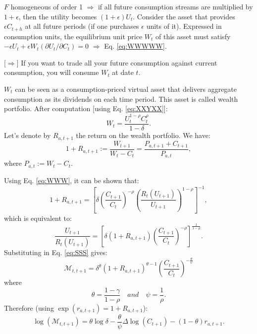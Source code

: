 \documentclass[
  12pt,
]{book}
\theoremstyle{definition}
\theoremstyle{definition}
\theoremstyle{definition}
\theoremstyle{definition}
\theoremstyle{remark}
\begin{document}
\(F\) homogeneous of order 1 \(\Rightarrow\) if all future consumption streams are multiplied by \(1+\epsilon\), then the utility becomes \((1+\epsilon)U_t\).
Consider the asset that provides \(\epsilon C_{t+h}\) at all future periods (if one purchases \(\epsilon\) units of it).
Expressed in consumption units, the equilibrium unit price \(W_t\) of this asset must satisfy \(-\epsilon U_t + \epsilon W_t (\partial U_t / \partial C_t)=0\) \(\Rightarrow\) Eq. \eqref{eq:WWWWW}.

{[}\(\Rightarrow\){]} If you want to trade all your future consumption against current consumption, you will consume \(W_t\) at date \(t\).

\(W_t\) can be seen as a consumption-priced virtual asset that delivers aggregate consumption as its dividends on each time period. This asset is called wealth portfolio.
After computation {[}using Eq. \eqref{eq:XXYXX}{]}:
\begin{equation}
W_t = \frac{U_t^{1-\rho}C_t^\rho}{1 - \delta}.\label{eq:WWW}
\end{equation}
Let's denote by \(R_{a,t+1}\) the return on the wealth portfolio. We have:
\begin{equation}
1+R_{a,t+1} := \frac{W_{t+1}}{W_t - C_t} = \frac{P_{a,t+1}+C_{t+1}}{P_{a,t}},\label{eq:Ra}
\end{equation}
where \(P_{a,t} := W_t - C_t\).

Using Eq. \eqref{eq:WWW}, it can be shown that:
\[
1+R_{a,t+1} = \left[ \delta \left( \frac{C_{t+1}}{C_t} \right)^{-\rho} \left( \frac{R_t(U_{t+1})}{U_{t+1}} \right)^{1-\rho} \right]^{-1},
\]
which is equivalent to:
\[
\frac{U_{t+1}}{R_t(U_{t+1})} = \left[ \delta (1+ R_{a,t+1}) \left( \frac{C_{t+1}}{C_t} \right)^{-\rho}  \right]^{\frac{1}{1-\rho}}.
\]
Substituting in Eq. \eqref{eq:SSS} gives:
\begin{equation}
\mathcal{M}_{t,t+1} =  \delta^{\theta} (1+R_{a,t+1})^{\theta - 1} \left( \frac{C_{t+1}}{C_t} \right)^{- \frac{\theta}{\psi}}
\end{equation}
where
\[
\theta = \frac{1-\gamma}{1-\rho} \quad and \quad \psi = \frac{1}{\rho}.
\]
Therefore (using \(\exp(r_{a,t+1})=1+R_{a,t+1}\)):
\begin{equation}
\boxed{\log(\mathcal{M}_{t,t+1}) = \theta \log \delta - \frac{\theta}{\psi} \Delta \log(C_{t+1}) - (1-\theta) r_{a,t+1}.}\label{eq:sdfEZ}
\end{equation}
\end{document}
